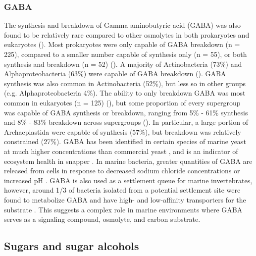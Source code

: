 \documentclass[utf8]{frontiersSCNS} %
\begin{document}
\subsubsection*{GABA}
The synthesis and breakdown of Gamma-aminobutyric acid (GABA) was also found to be relatively rare compared to other osmolytes in both prokaryotes and eukaryotes (). Most prokaryotes were only capable of GABA breakdown (n = 225), compared to a smaller number capable of synthesis only (n = 55), or both synthesis and breakdown (n = 52) (). A majority of Actinobacteria (73\%) and Alphaproteobacteria (63\%) were capable of GABA breakdown (). GABA synthesis was also common in Actinobacteria (52\%), but less so in other groups (e.g. Alphaproteobacteria 4\%). The ability to only breakdown GABA was most common in eukaryotes (n = 125) (), but some proportion of every supergroup was capable of GABA synthesis or breakdown, ranging from 5\% - 61\% synthesis and 8\% - 83\% breakdown across supergroups (). In particular, a large portion of Archaeplastida were capable of synthesis (57\%), but breakdown was relatively constrained (27\%). GABA has been identified in certain species of marine yeast at much higher concentrations than commercial yeast \citep{Masuda2008}, and is an indicator of ecosystem health in snapper \citep{Goode2020}. In marine bacteria, greater quantities of GABA are released from cells in response to decreased sodium chloride concentrations or increased pH \citep{Mountfort1992}. GABA is also used as a settlement queue for marine invertebrates, however, around 1/3 of bacteria isolated from a potential settlement site were found to metabolize GABA and have high- and low-affinity transporters for the substrate \citep{Kaspar1991}. This suggests a complex role in marine environments where GABA serves as a signaling compound, osmolyte, and carbon substrate.

\subsection{Sugars and sugar alcohols}
\end{document}
